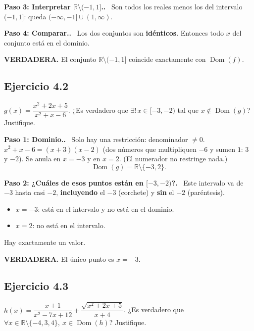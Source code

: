 \documentclass[11pt,a4paper]{article}
\newcommand{\R}{\mathbb{R}}
\newcommand{\dom}{\operatorname{Dom}}
\newcommand{\paso}[1]{\par\medskip\noindent\textbf{\textcolor{blue!50!black}{Paso #1.}}\ }
\begin{document}
\paso{3: Interpretar $\R\setminus(-1,1]$.} Son todos los reales menos los del intervalo $(-1,1]$: queda $(-\infty,-1]\cup(1,\infty)$.

\paso{4: Comparar.} Los dos conjuntos son \textbf{idénticos}. Entonces todo $x$ del conjunto está en el dominio.
\begin{respuesta}
\textbf{VERDADERA.} El conjunto $\R\setminus(-1,1]$ coincide exactamente con $\dom(f)$.
\end{respuesta}

\subsection{Ejercicio 4.2}
\begin{enunciado}
$g(x)=\dfrac{x^2+2x+5}{x^2+x-6}$. ¿Es verdadero que $\exists!\,x\in[-3,-2)$ tal que $x\notin\dom(g)$? Justifique.
\end{enunciado}

\paso{1: Dominio.} Solo hay una restricción: denominador $\ne0$.
$x^2+x-6=(x+3)(x-2)$ (dos números que multipliquen $-6$ y sumen $1$: $3$ y $-2$).
Se anula en $x=-3$ y en $x=2$. (El numerador no restringe nada.)
\[ \dom(g)=\R\setminus\{-3,2\}. \]

\paso{2: ¿Cuáles de esos puntos están en $[-3,-2)$?}
Este intervalo va de $-3$ hasta casi $-2$, \textbf{incluyendo} el $-3$ (corchete) y \textbf{sin} el $-2$ (paréntesis).
\begin{itemize}[nosep]
  \item $x=-3$: está en el intervalo y no está en el dominio. \checkmark
  \item $x=2$: no está en el intervalo.
\end{itemize}
Hay exactamente un valor.
\begin{respuesta}
\textbf{VERDADERA.} El único punto es $x=-3$.
\end{respuesta}

\subsection{Ejercicio 4.3}
\begin{enunciado}
$h(x)=\dfrac{x+1}{x^2-7x+12}+\dfrac{\sqrt{x^2+2x+5}}{x+4}$. ¿Es verdadero que $\forall x\in\R\setminus\{-4,3,4\},\ x\in\dom(h)$? Justifique.
\end{enunciado}
\end{document}
